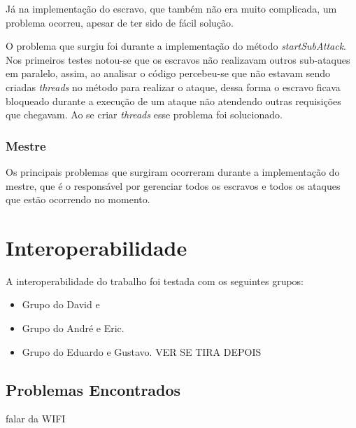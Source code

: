 \documentclass[
	12pt,				%
    oneside,			%
	a4paper,			%
	english,			%
	brazil,				%
	]{abntex2}
\begin{document}
%

Já na implementação do escravo, que também não era muito complicada, um problema ocorreu, apesar de 
ter sido de fácil solução.

O problema que surgiu foi durante a implementação do método \textit{startSubAttack}. Nos primeiros testes notou-se que os escravos não realizavam outros sub-ataques em paralelo, assim, ao analisar o código percebeu-se que não estavam sendo criadas \textit{threads} no método para realizar o ataque, dessa forma o escravo ficava bloqueado durante a execução de um ataque não atendendo outras requisições que chegavam. Ao se criar \textit{threads} esse problema foi solucionado.

\subsection{Mestre}
Os principais problemas que surgiram ocorreram durante a implementação do mestre, que é o responsável por gerenciar
todos os escravos e todos os ataques que estão ocorrendo no momento.


\chapter{Interoperabilidade}
A interoperabilidade do trabalho foi testada com os seguintes grupos:
\begin{itemize}
\item Grupo do David e
\item Grupo do André e Eric.
\item Grupo do Eduardo e Gustavo.   VER SE TIRA DEPOIS
\end{itemize}

\section{Problemas Encontrados}
falar da WIFI
\end{document}
